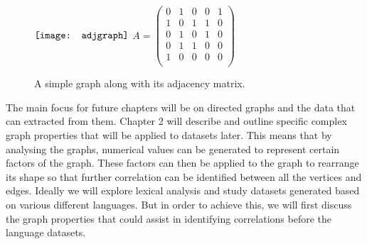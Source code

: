 \begin{figure}[!htb]
\centering
$\vcenter{\hbox{\texttt{[image: adjgraph]}}}$
\hfill
$A = \begin{pmatrix}
0 & 1 & 0 & 0 & 1 \\
1 & 0 & 1 & 1 & 0 \\
0 & 1 & 0 & 1 & 0 \\
0 & 1 & 1 & 0 & 0 \\
1 & 0 & 0 & 0 & 0 \\
\end{pmatrix} $
\caption{A simple graph along with its adjacency matrix.}
\label{fig:Adjacency Graph}
\end{figure}

The main focus for future chapters will be on directed graphs and the data that can extracted from them. Chapter 2 will describe and outline specific complex graph properties that will be applied to datasets later. This means that by analysing the graphs, numerical values can be generated to represent certain factors of the graph. These factors can then be applied to the graph to rearrange its shape so that further correlation can be identified between all the vertices and edges. Ideally we will explore lexical analysis and study datasets generated based on various different languages. But in order to achieve this, we will first discuss the graph properties that could assist in identifying correlations before the language datasets.